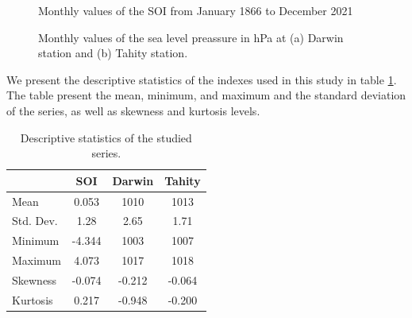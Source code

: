 \documentclass[onecolumn, preprint,aps,amsmath, amssymb, superscriptaddress]{revtex4}
\begin{document}
\begin{figure}
\caption{Monthly values of the SOI from January 1866 to December 2021}
\label{fig:SOI}
\end{figure}

\begin{figure}
\caption{Monthly values of the sea level preassure in hPa at (a) Darwin station and (b) Tahity station.}
\label{fig:stations}
\end{figure}

We present the descriptive statistics of the indexes used in this study in table \ref{tab:descriptive}. The table present the mean, minimum, and maximum and the standard deviation of the series, as well as skewness and kurtosis levels.
\begin{table}[]
\caption{Descriptive statistics of the studied series.}
\label{tab:descriptive}
\begin{tabular}{lccc}
\hline
          & SOI    & Darwin & Tahity \\ \hline
Mean      & 0.053  & 1010   & 1013   \\
Std. Dev. & 1.28   & 2.65   & 1.71   \\
Minimum   & -4.344 & 1003   & 1007   \\
Maximum   & 4.073  & 1017   & 1018   \\
Skewness  & -0.074 & -0.212 & -0.064 \\
Kurtosis  & 0.217  & -0.948 & -0.200 \\ \hline
\end{tabular}
\end{table}
\end{document}
